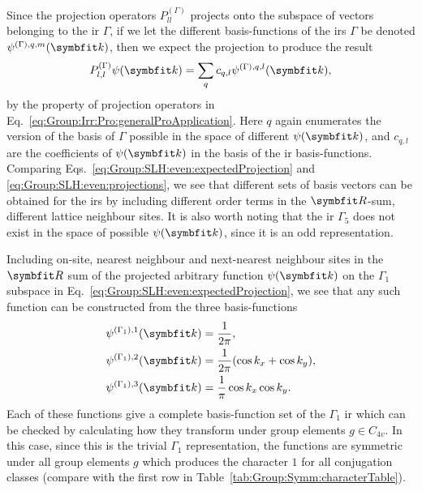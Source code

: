%
Since the projection operators $P_{ll}^{(\Gamma)}$ projects onto the subspace of vectors belonging to the \ac{ir} $\Gamma$, if we
let the different basis-functions of the \ac{ir}s $\Gamma$ be denoted $\psi^{(\Gamma),q,m}(\v{k})$, then we expect the projection to produce the result
\begin{equation}
    \label{eq:Group:SLH:even:expectedProjection}
    P_{l,l}^{(\Gamma)}\psi(\v{k}) = \sum_{q}c_{q,l}\psi^{(\Gamma),q,l}(\v{k}),
\end{equation}
by the property of projection operators in Eq.~\eqref{eq:Group:Irr:Pro:generalProApplication}. Here $q$ again enumerates the version of the basis of $\Gamma$ possible in the space of different $\psi(\v{k})$, and $c_{q,l}$ are the coefficients of
$\psi(\v{k})$ in the basis of the \ac{ir} basis-functions. Comparing Eqs.~\eqref{eq:Group:SLH:even:expectedProjection} and \eqref{eq:Group:SLH:even:projections},
we see that different sets of basis vectors can be obtained for the \ac{ir}s by including different order terms in the $\v{R}$-sum,
\ie different lattice neighbour sites. It is also worth noting that the \ac{ir} $\Gamma_5$ does not exist in the space of possible $\psi(\v{k})$,
since it is an odd representation.

Including on-site, nearest neighbour and next-nearest neighbour sites in the $\v{R}$ sum of the projected arbitrary function $\psi(\v{k})$ on the $\Gamma_1$ subspace in
Eq.~\eqref{eq:Group:SLH:even:expectedProjection}, we see that any such function can be constructed from the three basis-functions
\begin{subequations}
    \label{eq:Group:SLH:even:G1basis}
    \begin{align}
        \label{eq:Group:SLH:even:G1basis:1}
        \psi^{(\Gamma_1),1}(\v{k}) &= \frac{1}{2\pi},\\
        \label{eq:Group:SLH:even:G1basis:2}
        \psi^{(\Gamma_1),2}(\v{k}) &= \frac{1}{2\pi}(\cos k_x + \cos k_y),\\
        \label{eq:Group:SLH:even:G1basis:3}
        \psi^{(\Gamma_1),3}(\v{k}) &= \frac{1}{\pi}\cos k_x \cos k_y.
    \end{align}
\end{subequations}
Each of these functions give a complete basis-function set of the $\Gamma_1$ \ac{ir} which can be checked by calculating how they transform under
group elements $g\in C_{4v}$. In this case, since this is the trivial $\Gamma_1$ representation, the functions are symmetric under all group elements $g$ which
produces the character $1$ for all conjugation classes (compare with the first row in Table~\ref{tab:Group:Symm:characterTable}). 

